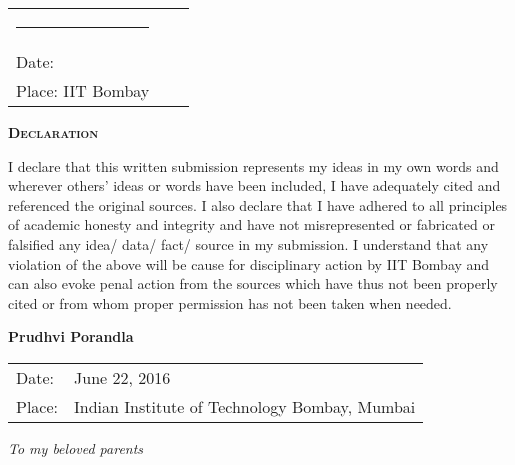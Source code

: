 \vspace{5mm}
\begin{tabular}{lll}
	\rule{40mm}{0pt}        & \rule{50mm}{0pt}       & \rule{60mm}{0pt} \\
	Date:\dotfill			&                        & \\
	Place: IIT Bombay       &                        & \\
\end{tabular}
\newpage
\thispagestyle{empty}
\begin{center}
	\begin{Huge}
		\textsc{\textbf{Declaration}}
	\end{Huge}
\end{center}

\vspace{0.5in}

 I declare that this written submission represents my ideas in my own words and wherever others' ideas or words have been included, I have adequately cited and referenced the original sources. I also declare that I have adhered to all principles of academic honesty and integrity and have not misrepresented or fabricated or falsified any idea/ data/ fact/ source in my submission. I understand that any violation of the above will be cause for disciplinary action by IIT Bombay and can also evoke penal action from the sources which have thus not been properly cited or from whom proper permission has not been taken when needed.

\vspace{1.5in}
	\hfill \textbf{Prudhvi Porandla}\\
	\noindent
	\begin{tabular}{ll}
		Date: & June 22, 2016\\ \vspace{30pt}
		Place: & Indian Institute of Technology Bombay, Mumbai\\
	\end{tabular}

		\newpage
		\thispagestyle{empty}    %

		\begin{center}  \null\vfill
			\textit{\Large To my beloved parents}
			\null\vfill
		\end{center}

